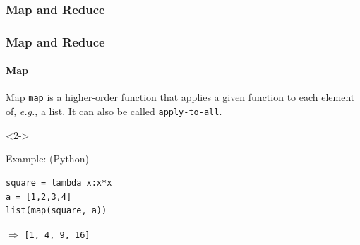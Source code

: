 \documentclass[aspectratio=169,usenames,dvipsnames]{beamer}
\begin{document}
    \begin{frame}
        \frametitle{Map and Reduce}
        \color{lightgray}
        \begin{center}
        \end{center}
        \begin{center}
        \end{center}
        \begin{center}
        \end{center}
        \begin{center}
        \end{center}
    \end{frame}

    \begin{frame}[fragile]
        \frametitle{Map and Reduce}
        \framesubtitle{Map}

            \begin{block}{Map}
                \texttt{map} is a higher-order function that applies a given
                function to each element of, \textit{e.g.}, a list. It can also
                be called \texttt{apply-to-all}.
            \end{block}
            \begin{uncoverenv}<2->
            \begin{block}{Example: \hfill \small(Python)}
            \begin{center}
            \begin{minipage}{0.8\linewidth}
            \begin{lstlisting}
square = lambda x:x*x
a = [1,2,3,4]
list(map(square, a))
            \end{lstlisting}
            $\Rightarrow$ \texttt{[1, 4, 9, 16]}
            \end{minipage}
            \end{center}
            \end{block}
            \end{uncoverenv}
        
    \end{frame}
    
\end{document}
